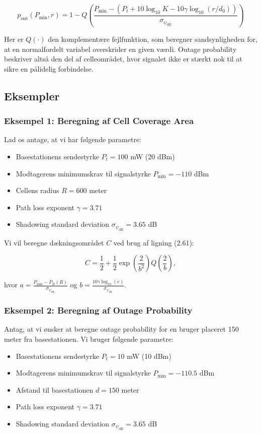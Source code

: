 \documentclass[a4paper,12pt]{book}
\begin{document}
	\[
	p_{\text{out}}(P_{\text{min}}, r) = 1 - Q\left(\frac{P_{\text{min}} - \left(P_t + 10 \log_{10} K - 10 \gamma \log_{10}(r/d_0)\right)}{\sigma_{\psi_{\text{dB}}}}\right)
	\]
	
	Her er \( Q(\cdot) \) den komplementære fejlfunktion, som beregner sandsynligheden for, at en normalfordelt variabel overskrider en given værdi. Outage probability beskriver altså den del af celleområdet, hvor signalet ikke er stærkt nok til at sikre en pålidelig forbindelse.
	
	\subsection{Eksempler}
	
	\subsubsection{Eksempel 1: Beregning af Cell Coverage Area}
	
	Lad os antage, at vi har følgende parametre:
	\begin{itemize}
		\item Basestationens sendestyrke \( P_t = 100 \) mW (20 dBm)
		\item Modtagerens minimumskrav til signalstyrke \( P_{\text{min}} = -110 \) dBm
		\item Cellens radius \( R = 600 \) meter
		\item Path loss exponent \( \gamma = 3.71 \)
		\item Shadowing standard deviation \( \sigma_{\psi_{\text{dB}}} = 3.65 \) dB
	\end{itemize}
	
	Vi vil beregne dækningsområdet \( C \) ved brug af ligning (2.61):
	
	\[
	C = \frac{1}{2} + \frac{1}{2} \exp \left( \frac{2}{b^2} \right) Q \left( \frac{2}{b} \right),
	\]
	
	hvor \( a = \frac{P_{\text{min}} - P_R(R)}{\sigma_{\psi_{\text{dB}}}} \) og \( b = \frac{10 \gamma \log_{10}(e)}{\sigma_{\psi_{\text{dB}}}} \).
	
	\subsubsection{Eksempel 2: Beregning af Outage Probability}
	
	Antag, at vi ønsker at beregne outage probability for en bruger placeret 150 meter fra basestationen. Vi bruger følgende parametre:
	\begin{itemize}
		\item Basestationens sendestyrke \( P_t = 10 \) mW (10 dBm)
		\item Modtagerens minimumskrav til signalstyrke \( P_{\text{min}} = -110.5 \) dBm
		\item Afstand til basestationen \( d = 150 \) meter
		\item Path loss exponent \( \gamma = 3.71 \)
		\item Shadowing standard deviation \( \sigma_{\psi_{\text{dB}}} = 3.65 \) dB
	\end{itemize}
	
\end{document}
